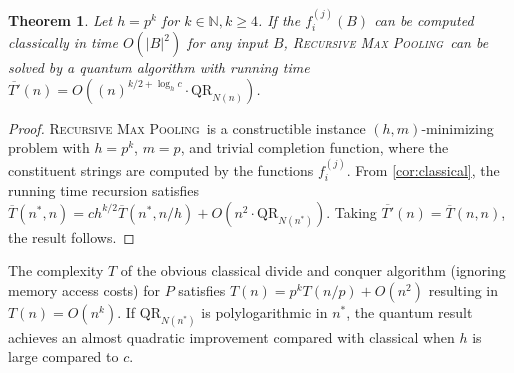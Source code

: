 \documentclass[12pt]{article}
\newcommand{\qr}{\mathrm{QR}}
\newcommand{\RMP}{\textsc{Recursive Max Pooling}}
\newtheorem{theorem}{Theorem}
\theoremstyle{definition}
\begin{document}
\begin{theorem}
    Let $h = p^k$ for $k\in\mathbb{N}, k\ge 4$. If the $f^{(j)}_i(B)$ can be computed classically in time $O(|B|^2)$ for any input $B$, \RMP\ can be solved by a quantum algorithm with running time $\overline{T'}(n) = O((n)^{k/2 + \log_hc}\cdot \qr_{N(n)})$.
\end{theorem}

\begin{proof}
    \RMP\ is a constructible instance $(h,m)$-minimizing problem with $h=p^k$, $m=p$, and trivial completion function, where the constituent strings are computed by the functions $f_i^{(j)}$. From \cref{cor:classical}, the running time recursion satisfies $\overline{T}(n^*, n) = ch^{k/2} \overline{T}(n^*, n/h) + O(n^2 \cdot \qr_{N(n^*)})$. Taking $\overline{T'}(n) = \overline{T}(n, n)$, the result follows. 
\end{proof}
The complexity $T$ of the obvious classical divide and conquer algorithm (ignoring memory access costs) for $P$ satisfies $T(n) = p^k T(n/p) + O(n^2)$ resulting in $T(n) = O(n^k)$. 
If $\qr_{N(n^*)}$ is polylogarithmic in  $n^*$, the quantum result achieves an almost quadratic improvement compared with classical when $h$ is large compared to $c$. 
\end{document}

